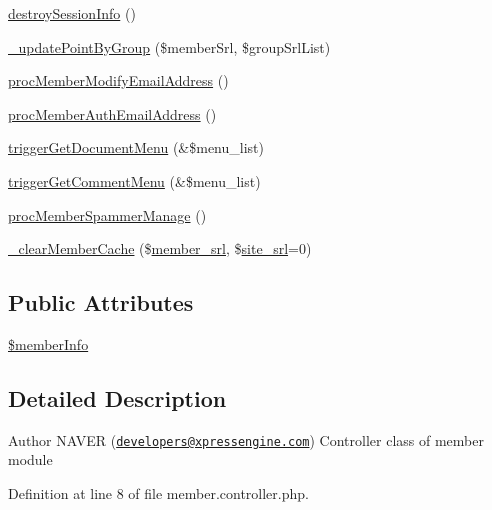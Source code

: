 \begin{DoxyCompactItemize}
\item 
\hyperlink{classmemberController_ac259eb5e2f5ea0b7e747608fa1a308bd}{destroy\-Session\-Info} ()
\item 
\hyperlink{classmemberController_abe9b21621506198b75656781e6919dba}{\-\_\-update\-Point\-By\-Group} (\$member\-Srl, \$group\-Srl\-List)
\item 
\hyperlink{classmemberController_ac5954a875ecc954379437d5c7762fdfe}{proc\-Member\-Modify\-Email\-Address} ()
\item 
\hyperlink{classmemberController_a7584206ce0ce606173fade04207fb1ea}{proc\-Member\-Auth\-Email\-Address} ()
\item 
\hyperlink{classmemberController_a4f6ca6a2a8db362cac531920762a94f9}{trigger\-Get\-Document\-Menu} (\&\$menu\-\_\-list)
\item 
\hyperlink{classmemberController_aa97406ab4da679f7b54cceb404bd563f}{trigger\-Get\-Comment\-Menu} (\&\$menu\-\_\-list)
\item 
\hyperlink{classmemberController_a99f87aecac7ae283cec747a007df88b8}{proc\-Member\-Spammer\-Manage} ()
\item 
\hyperlink{classmemberController_a6b061f30aaaa5c4f1f8da1d52fdb2da9}{\-\_\-clear\-Member\-Cache} (\$\hyperlink{ko_8install_8php_aa61f9e08f0fe505094d26f8143f30bbd}{member\-\_\-srl}, \$\hyperlink{ko_8install_8php_a8b1406b4ad1048041558dce6bfe89004}{site\-\_\-srl}=0)
\end{DoxyCompactItemize}
\subsection*{Public Attributes}
\begin{DoxyCompactItemize}
\item 
\hyperlink{classmemberController_a01868bd628d8e1b39a4256352fccad44}{\$member\-Info}
\end{DoxyCompactItemize}


\subsection{Detailed Description}
\begin{DoxyAuthor}{Author}
N\-A\-V\-E\-R (\href{mailto:developers@xpressengine.com}{\tt developers@xpressengine.\-com}) Controller class of member module 
\end{DoxyAuthor}


Definition at line 8 of file member.\-controller.\-php.



